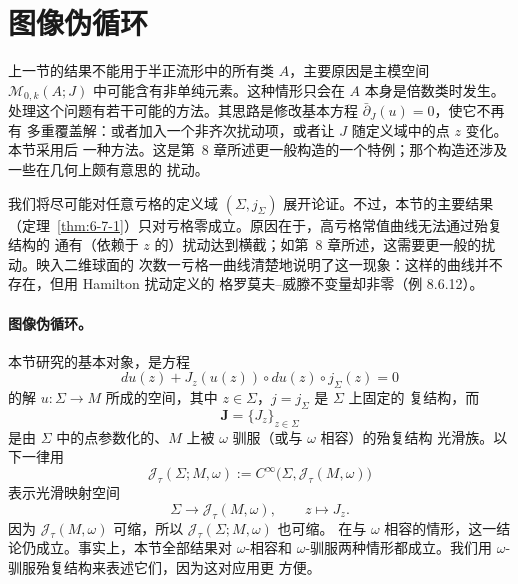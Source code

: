 
\section{图像伪循环}\label{sec:6-7}

上一节的结果不能用于半正流形中的所有类 $A$，主要原因是主模空间
$\mathcal M_{0,k}(A;J)$ 中可能含有非单纯元素。这种情形只会在 $A$ 本身是倍数类时发生。
处理这个问题有若干可能的方法。其思路是修改基本方程 $\bar\partial_J(u)=0$，使它不再有
多重覆盖解：或者加入一个非齐次扰动项，或者让 $J$ 随定义域中的点 $z$ 变化。本节采用后
一种方法。这是第~8 章所述更一般构造的一个特例；那个构造还涉及一些在几何上颇有意思的
扰动。

我们将尽可能对任意亏格的定义域 $(\Sigma,j_\Sigma)$ 展开论证。不过，本节的主要结果
（定理~\ref{thm:6-7-1}）只对亏格零成立。原因在于，高亏格常值曲线无法通过殆复结构的
通有（依赖于 $z$ 的）扰动达到横截；如第~8 章所述，这需要更一般的扰动。映入二维球面的
次数一亏格一曲线清楚地说明了这一现象：这样的曲线并不存在，但用 Hamilton 扰动定义的
格罗莫夫--威滕不变量却非零（例 8.6.12）。

\paragraph{图像伪循环。}
本节研究的基本对象，是方程
\begin{equation}\label{eq:6-7-1}
  du(z)+J_z(u(z))\circ du(z)\circ j_\Sigma(z)=0
\end{equation}
的解 $u:\Sigma\to M$ 所成的空间，其中 $z\in\Sigma$，$j=j_\Sigma$ 是 $\Sigma$ 上固定的
复结构，而
\[
  \mathbf J=\{J_z\}_{z\in\Sigma}
\]
是由 $\Sigma$ 中的点参数化的、$M$ 上被 $\omega$ 驯服（或与 $\omega$ 相容）的殆复结构
光滑族。以下一律用
\[
  \mathcal J_\tau(\Sigma;M,\omega)
  :=C^\infty\bigl(\Sigma,\mathcal J_\tau(M,\omega)\bigr)
\]
表示光滑映射空间
\[
  \Sigma\longrightarrow\mathcal J_\tau(M,\omega),
  \qquad z\longmapsto J_z.
\]
因为 $\mathcal J_\tau(M,\omega)$ 可缩，所以 $\mathcal J_\tau(\Sigma;M,\omega)$ 也可缩。
在与 $\omega$ 相容的情形，这一结论仍成立。事实上，本节全部结果对 $\omega$-相容和
$\omega$-驯服两种情形都成立。我们用 $\omega$-驯服殆复结构来表述它们，因为这对应用更
方便。

